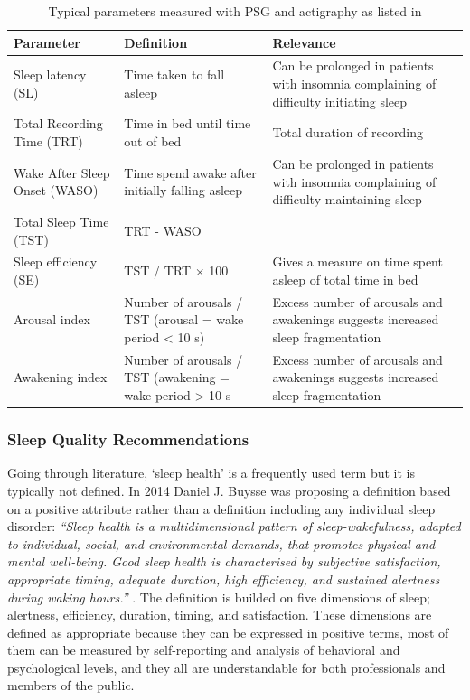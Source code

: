 \documentclass[12pt]{article} %
\begin{document}
\begin{table}[H]
\center
\begin{footnotesize}
	\begin{tabular}{|p{3.2cm} |p{4.6cm} |p{6.5cm} |}
	\hline
	\textbf{Parameter} & \textbf{Definition} & \textbf{Relevance}\\
	\hline
	Sleep latency (SL) & Time taken to fall asleep & Can be prolonged in patients with insomnia complaining of difficulty initiating sleep \\
	\hline
	Total Recording Time (TRT) & Time in bed until time out of bed & Total duration of recording\\
	\hline
	Wake After Sleep Onset (WASO) & Time spend awake after initially falling asleep & Can be prolonged in patients with insomnia complaining of difficulty maintaining sleep \\
	\hline
	Total Sleep Time (TST) & TRT - WASO & \\
	\hline
	Sleep efficiency (SE) & TST / TRT $\times$ 100 & Gives a measure on time spent asleep of total time in bed \\
	\hline
	Arousal index & Number of arousals / TST (arousal = wake period < 10 s) & Excess number of arousals and awakenings suggests increased sleep fragmentation\\ 
	\hline
	Awakening index & Number of arousals / TST (awakening = wake period > 10 s & Excess number of arousals and awakenings suggests increased sleep fragmentation \\
	\hline
	\end{tabular}
	\caption{Typical parameters measured with PSG and actigraphy as listed in \cite{consumer}}
	\label{tab:psgparameters}
\end{footnotesize}
\end{table}

\subsubsection{Sleep Quality Recommendations}
Going through literature, `sleep health' is a frequently used term but it is typically not defined. In 2014 Daniel J. Buysse was proposing a definition based on a positive attribute rather than a definition including any individual sleep disorder:
\textit{``Sleep health is a multidimensional pattern of sleep-wakefulness, adapted to individual, social, and environmental demands, that promotes physical and mental well-being. Good sleep health is characterised by subjective satisfaction, appropriate timing, adequate duration, high efficiency, and sustained alertness during waking hours.''} \cite{define}. 
The definition is builded on five dimensions of sleep; alertness, efficiency, duration, timing, and satisfaction. These dimensions are defined as appropriate because they can be expressed in positive terms, most of them can be measured by self-reporting and analysis of behavioral and psychological levels, and they all are understandable for both professionals and members of the public. \\
\end{document}
